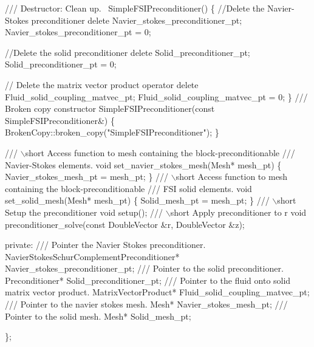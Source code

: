 \begin{DoxyCodeInclude}
 \textcolor{comment}{}
\textcolor{comment}{ /// Destructor: Clean up.}
\textcolor{comment}{} ~SimpleFSIPreconditioner()
  \{
   \textcolor{comment}{//Delete the Navier-Stokes preconditioner}
   \textcolor{keyword}{delete} Navier\_stokes\_preconditioner\_pt; Navier\_stokes\_preconditioner\_pt = 0;
   
   \textcolor{comment}{//Delete the solid preconditioner}
   \textcolor{keyword}{delete} Solid\_preconditioner\_pt; Solid\_preconditioner\_pt = 0;
   
   \textcolor{comment}{// Delete the matrix vector product operator}
   \textcolor{keyword}{delete} Fluid\_solid\_coupling\_matvec\_pt; Fluid\_solid\_coupling\_matvec\_pt = 0;
  \}
 \textcolor{comment}{}
\textcolor{comment}{ /// Broken copy constructor}
\textcolor{comment}{} SimpleFSIPreconditioner(\textcolor{keyword}{const} SimpleFSIPreconditioner&)
  \{
   BrokenCopy::broken\_copy(\textcolor{stringliteral}{"SimpleFSIPreconditioner"});
  \}
 
  \textcolor{comment}{}
\textcolor{comment}{ /// \(\backslash\)short Access function to mesh containing the block-preconditionable}
\textcolor{comment}{ /// Navier-Stokes elements. }
\textcolor{comment}{} \textcolor{keywordtype}{void} set\_navier\_stokes\_mesh(Mesh* mesh\_pt) 
  \{
   Navier\_stokes\_mesh\_pt = mesh\_pt;
  \}
\textcolor{comment}{}
\textcolor{comment}{ /// \(\backslash\)short Access function to mesh containing the block-preconditionable}
\textcolor{comment}{ /// FSI solid elements. }
\textcolor{comment}{} \textcolor{keywordtype}{void} set\_solid\_mesh(Mesh* mesh\_pt) 
  \{
   Solid\_mesh\_pt = mesh\_pt;
  \}
\textcolor{comment}{}
\textcolor{comment}{ /// \(\backslash\)short Setup the preconditioner}
\textcolor{comment}{} \textcolor{keywordtype}{void} setup();
 \textcolor{comment}{}
\textcolor{comment}{ /// \(\backslash\)short Apply preconditioner to r}
\textcolor{comment}{} \textcolor{keywordtype}{void} preconditioner\_solve(\textcolor{keyword}{const} DoubleVector &r,
                           DoubleVector &z);

\textcolor{keyword}{private}:
\textcolor{comment}{}
\textcolor{comment}{ /// Pointer the Navier Stokes preconditioner.}
\textcolor{comment}{} NavierStokesSchurComplementPreconditioner* Navier\_stokes\_preconditioner\_pt;
\textcolor{comment}{}
\textcolor{comment}{ /// Pointer to the solid preconditioner.}
\textcolor{comment}{} Preconditioner* Solid\_preconditioner\_pt;
\textcolor{comment}{}
\textcolor{comment}{ /// Pointer to the fluid onto solid matrix vector product.}
\textcolor{comment}{} MatrixVectorProduct* Fluid\_solid\_coupling\_matvec\_pt;
\textcolor{comment}{}
\textcolor{comment}{ /// Pointer to the navier stokes mesh.}
\textcolor{comment}{} Mesh* Navier\_stokes\_mesh\_pt;
\textcolor{comment}{}
\textcolor{comment}{ /// Pointer to the solid mesh.}
\textcolor{comment}{} Mesh* Solid\_mesh\_pt;

\};

\end{DoxyCodeInclude}
